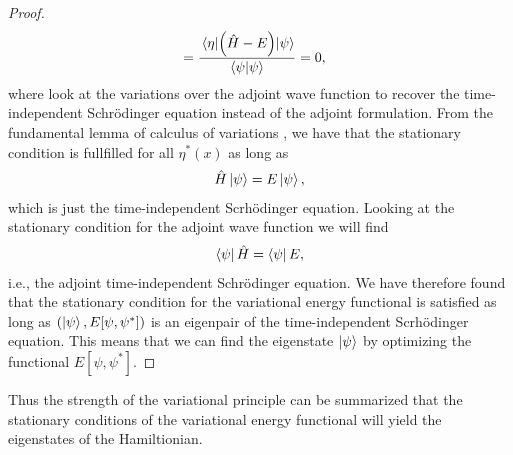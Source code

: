 \begin{proof}
\begin{align}
                &=
                \frac{
                    \mel{\eta}{\left( \hat{H}- E \right)}{\psi}
                }{
                    \braket{\psi}
                }
                = 0,
            \end{align}
            where look at the variations over the adjoint wave function to
            recover the time-independent Schrödinger equation instead of the
            adjoint formulation.
            From the fundamental lemma of calculus of variations
            \cite{wiki:fundamental-lemma}, we have that the stationary condition
            is fullfilled for all $\eta^{*}(x)$ as long as
            \begin{align}
                \hat{H}\ket{\psi}
                = E\ket{\psi},
            \end{align}
            which is just the time-independent Scrhödinger equation.
            Looking at the stationary condition for the adjoint wave function we
            will find
            \begin{align}
                \bra{\psi}\hat{H} = \bra{\psi}E,
            \end{align}
            i.e., the adjoint time-independent Schrödinger equation.
            We have therefore found that the stationary condition for the
            variational energy functional is satisfied as long as $(\ket{\psi},
            E[\psi, \psi^{*}])$ is an eigenpair of the time-independent
            Scrhödinger equation.
            This means that we can find the eigenstate $\ket{\psi}$ by
            optimizing the functional $E[\psi, \psi^{*}]$.
        \end{proof}
        Thus the strength of the variational principle can be summarized that
        the stationary conditions of the variational energy functional will
        yield the eigenstates of the Hamiltionian.

